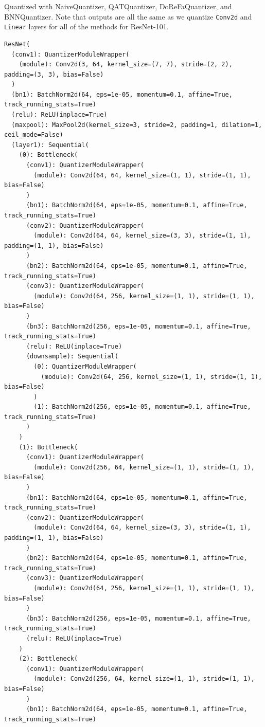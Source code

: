 \documentclass{article}
\begin{document}
Quantized with NaiveQuantizer, QATQuantizer, DoReFaQuantizer, and BNNQuantizer. Note that outputs are all the same as we quantize \verb|Conv2d| and \verb|Linear| layers for all of the methods for ResNet-101.

\begin{verbatim}
ResNet(
  (conv1): QuantizerModuleWrapper(
    (module): Conv2d(3, 64, kernel_size=(7, 7), stride=(2, 2), padding=(3, 3), bias=False)
  )
  (bn1): BatchNorm2d(64, eps=1e-05, momentum=0.1, affine=True, track_running_stats=True)
  (relu): ReLU(inplace=True)
  (maxpool): MaxPool2d(kernel_size=3, stride=2, padding=1, dilation=1, ceil_mode=False)
  (layer1): Sequential(
    (0): Bottleneck(
      (conv1): QuantizerModuleWrapper(
        (module): Conv2d(64, 64, kernel_size=(1, 1), stride=(1, 1), bias=False)
      )
      (bn1): BatchNorm2d(64, eps=1e-05, momentum=0.1, affine=True, track_running_stats=True)
      (conv2): QuantizerModuleWrapper(
        (module): Conv2d(64, 64, kernel_size=(3, 3), stride=(1, 1), padding=(1, 1), bias=False)
      )
      (bn2): BatchNorm2d(64, eps=1e-05, momentum=0.1, affine=True, track_running_stats=True)
      (conv3): QuantizerModuleWrapper(
        (module): Conv2d(64, 256, kernel_size=(1, 1), stride=(1, 1), bias=False)
      )
      (bn3): BatchNorm2d(256, eps=1e-05, momentum=0.1, affine=True, track_running_stats=True)
      (relu): ReLU(inplace=True)
      (downsample): Sequential(
        (0): QuantizerModuleWrapper(
          (module): Conv2d(64, 256, kernel_size=(1, 1), stride=(1, 1), bias=False)
        )
        (1): BatchNorm2d(256, eps=1e-05, momentum=0.1, affine=True, track_running_stats=True)
      )
    )
    (1): Bottleneck(
      (conv1): QuantizerModuleWrapper(
        (module): Conv2d(256, 64, kernel_size=(1, 1), stride=(1, 1), bias=False)
      )
      (bn1): BatchNorm2d(64, eps=1e-05, momentum=0.1, affine=True, track_running_stats=True)
      (conv2): QuantizerModuleWrapper(
        (module): Conv2d(64, 64, kernel_size=(3, 3), stride=(1, 1), padding=(1, 1), bias=False)
      )
      (bn2): BatchNorm2d(64, eps=1e-05, momentum=0.1, affine=True, track_running_stats=True)
      (conv3): QuantizerModuleWrapper(
        (module): Conv2d(64, 256, kernel_size=(1, 1), stride=(1, 1), bias=False)
      )
      (bn3): BatchNorm2d(256, eps=1e-05, momentum=0.1, affine=True, track_running_stats=True)
      (relu): ReLU(inplace=True)
    )
    (2): Bottleneck(
      (conv1): QuantizerModuleWrapper(
        (module): Conv2d(256, 64, kernel_size=(1, 1), stride=(1, 1), bias=False)
      )
      (bn1): BatchNorm2d(64, eps=1e-05, momentum=0.1, affine=True, track_running_stats=True)

\end{verbatim}
\end{document}
